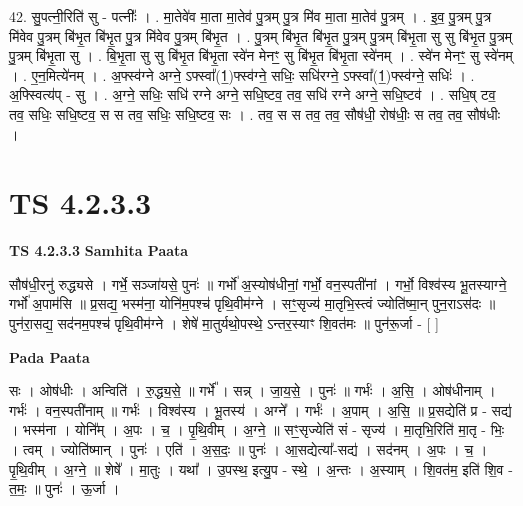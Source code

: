 \documentclass[17pt]{extarticle}
\begin{document}
42. सु॒पत्नी॒रिति॑ सु - पत्नीः᳚ । . मा॒तेवे॑व मा॒ता मा॒तेव॑ पु॒त्रम् पु॒त्र मि॑व मा॒ता मा॒तेव॑ पु॒त्रम् । . इ॒व॒ पु॒त्रम् पु॒त्र मि॑वेव पु॒त्रम् बि॑भृ॒त बि॑भृ॒त पु॒त्र मि॑वेव पु॒त्रम् बि॑भृ॒त । . पु॒त्रम् बि॑भृ॒त बि॑भृ॒त पु॒त्रम् पु॒त्रम् बि॑भृ॒ता सु सु बि॑भृ॒त पु॒त्रम् पु॒त्रम् बि॑भृ॒ता सु । . बि॒भृ॒ता सु सु बि॑भृ॒त बि॑भृ॒ता स्वे॑न मेनꣳ॒॒ सु बि॑भृ॒त बि॑भृ॒ता स्वे॑नम् । . स्वे॑न मेनꣳ॒॒ सु स्वे॑नम् । . ए॒न॒मित्ये॑नम् । . अ॒फ्स्व॑ग्ने अग्ने॒ ऽफ्स्वा᳚(1॒)फ्स्व॑ग्ने॒ सधिः॒ सधि॑रग्ने॒ ऽफ्स्वा᳚(1॒)फ्स्व॑ग्ने॒ सधिः॑ । . अ॒फ्स्वित्य॑प् - सु । . अ॒ग्ने॒ सधिः॒ सधि॑ रग्ने अग्ने॒ सधि॒ष्टव॒ तव॒ सधि॑ रग्ने अग्ने॒ सधि॒ष्टव॑ । . सधि॒ष् टव॒ तव॒ सधिः॒ सधि॒ष्टव॒ स स तव॒ सधिः॒ सधि॒ष्टव॒ सः । . तव॒ स स तव॒ तव॒ सौष॑धी॒ रोष॑धीः॒ स तव॒ तव॒ सौष॑धीः । \newline
\pagebreak
{}

\section{ TS 4.2.3.3 }

\textbf{TS 4.2.3.3 } \newline
\textbf{Samhita Paata} \newline

सौष॑धी॒रनु॑ रुद्ध्यसे । गर्भे॒ सञ्जा॑यसे॒ पुनः॑ ॥ गर्भो॑ अ॒स्योष॑धीनां॒ गर्भो॒ वन॒स्पती॑नां । गर्भो॒ विश्व॑स्य भू॒तस्याग्ने॒ गर्भो॑ अ॒पाम॑सि ॥ प्र॒सद्य॒ भस्म॑ना॒ योनि॑म॒पश्च॑ पृथि॒वीम॑ग्ने । सꣳ॒॒सृज्य॑ मा॒तृभि॒स्त्वं ज्योति॑ष्मा॒न् पुन॒राऽस॑दः ॥ पुन॑रा॒सद्य॒ सद॑नम॒पश्च॑ पृथि॒वीम॑ग्ने । शेषे॑ मा॒तुर्यथो॒पस्थे॒ ऽन्तर॒स्याꣳ शि॒वत॑मः ॥ पुन॑रू॒र्जा - [  ] \newline

\textbf{Pada Paata} \newline

सः । ओष॑धीः । अन्विति॑ । रु॒द्ध्य॒से॒ ॥ गर्भे᳚ । सन्न् । जा॒य॒से॒ । पुनः॑ ॥ गर्भः॑ । अ॒सि॒ । ओष॑धीनाम् । गर्भः॑ । वन॒स्पती॑नाम् ॥ गर्भः॑ । विश्व॑स्य । भू॒तस्य॑ । अग्ने᳚ । गर्भः॑ । अ॒पाम् । अ॒सि॒ ॥ प्र॒सद्येति॑ प्र - सद्य॑ । भस्म॑ना । योनि᳚म् । अ॒पः । च॒ । पृ॒थि॒वीम् । अ॒ग्ने॒ ॥ सꣳ॒॒सृज्येति॑ सं - सृज्य॑ । मा॒तृभि॒रिति॑ मा॒तृ - भिः॒ । त्वम् । ज्योति॑ष्मान् । पुनः॑ । एति॑ । अ॒स॒दः॒ ॥ पुनः॑ । आ॒सद्येत्या᳚-सद्य॑ । सद॑नम् । अ॒पः । च॒ । पृ॒थि॒वीम् । अ॒ग्ने॒ ॥ शेषे᳚ । मा॒तुः । यथा᳚ । उ॒पस्थ॒ इत्यु॒प - स्थे॒ । अ॒न्तः । अ॒स्याम् । शि॒वत॑म॒ इति॑ शि॒व - त॒मः॒ ॥ पुनः॑ । ऊ॒र्जा ।  \newline
\end{document}
